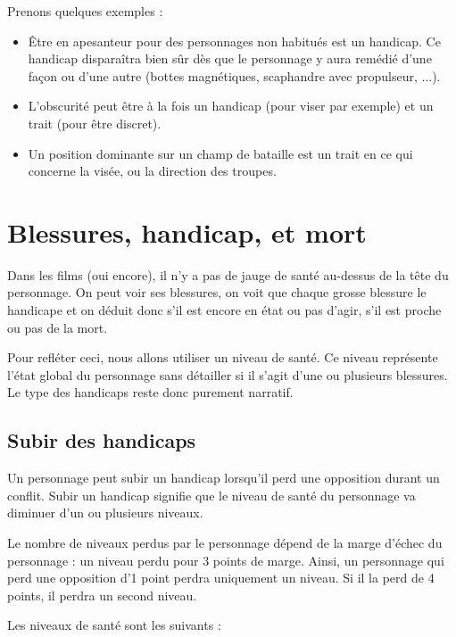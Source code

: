 \documentclass{conf/FusinaClass}
\begin{document}
Prenons quelques exemples :

\begin{itemize}
\item Être en apesanteur pour des personnages non habitués est un handicap. Ce handicap disparaîtra bien sûr dès que le personnage y aura remédié d'une façon ou d'une autre (bottes magnétiques, scaphandre avec propulseur, ...).
\item L'obscurité peut être à la fois un handicap (pour viser par exemple) et un trait (pour être discret).
\item Un position dominante sur un champ de bataille est un trait en ce qui concerne la visée, ou la direction des troupes.
\end{itemize}

\chapter{Blessures, handicap, et mort}
Dans les films (oui encore), il n'y a pas de jauge de santé au-dessus de la tête du personnage. On peut voir ses blessures, on voit que chaque grosse blessure le handicape et on déduit donc s'il est encore en état ou pas d'agir, s'il est proche ou pas de la mort.

Pour refléter ceci, nous allons utiliser un niveau de santé. Ce niveau représente l'état global du personnage sans détailler si il s'agit d'une ou plusieurs blessures. Le type des handicaps reste donc purement narratif.

\section{Subir des handicaps}
Un personnage peut subir un handicap lorsqu'il perd une opposition durant un conflit. Subir un handicap signifie que le niveau de santé du personnage va diminuer d'un ou plusieurs niveaux.

Le nombre de niveaux perdus par le personnage dépend de la marge d'échec du personnage : un niveau perdu pour 3 points de marge. Ainsi, un personnage qui perd une opposition d'1 point perdra uniquement un niveau. Si il la perd de 4 points, il perdra un second niveau.

Les niveaux de santé sont les suivants :
\end{document}
